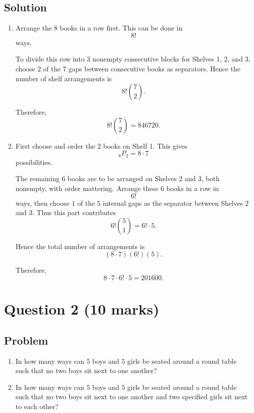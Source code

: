 \documentclass[12pt]{article}
\begin{document}
\subsection{Solution}

\begin{enumerate}[label=(\alph*)]
    \item Arrange the $8$ books in a row first. This can be done in
    \[
    8!
    \]
    ways.

    To divide this row into $3$ nonempty consecutive blocks for Shelves 1, 2, and 3, choose $2$ of the $7$ gaps between consecutive books as separators. Hence the number of shelf arrangements is
    \[
    8!\binom{7}{2}.
    \]

    Therefore,
    \[
    \boxed{8!\binom{7}{2}=846720}.
    \]

    \item First choose and order the $2$ books on Shelf 1. This gives
    \[
    {}_8P_2=8\cdot 7
    \]
    possibilities.

    The remaining $6$ books are to be arranged on Shelves 2 and 3, both nonempty, with order mattering. Arrange these $6$ books in a row in
    \[
    6!
    \]
    ways, then choose $1$ of the $5$ internal gaps as the separator between Shelves 2 and 3. Thus this part contributes
    \[
    6!\binom{5}{1}=6!\cdot 5.
    \]

    Hence the total number of arrangements is
    \[
    (8\cdot 7)(6!)(5).
    \]

    Therefore,
    \[
    \boxed{8\cdot 7\cdot 6!\cdot 5=201600}.
    \]
\end{enumerate}

\newpage
\section{Question 2 \hfill (10 marks)}
\subsection{Problem}

\begin{enumerate}[label=(\alph*)]
    \item In how many ways can $5$ boys and $5$ girls be seated around a round table such that no two boys sit next to one another?
    \item In how many ways can $5$ boys and $5$ girls be seated around a round table such that no two boys sit next to one another and two specified girls sit next to each other?
\end{enumerate}
\end{document}
